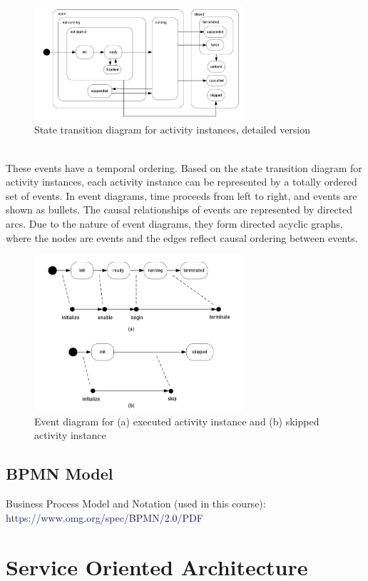 \documentclass[10pt,a4paper]{article}
\begin{document}
\begin{figure}[ht!]
 \hfill \includegraphics[width=220pt]{images/activity-models-2}\hspace*{\fill}
 \caption{State transition diagram for activity instances, detailed version}
  \label{fig:activity-models-2}
\end{figure}\\
These events have a temporal ordering. Based on the state transition diagram for activity instances, each activity instance can be represented by a totally ordered set of events. 
\pagebreak
In event diagrams, time proceeds from left to right, and events are shown as bullets. The causal relationships of events are represented by directed arcs. Due to the nature of event diagrams, they form directed acyclic graphs, where the nodes are events and the edges reflect causal ordering between events.
\begin{figure}[ht!]
 \hfill \includegraphics[width=220pt]{images/event-diagram}\hspace*{\fill}
 \caption{Event diagram for (a) executed activity instance and (b) skipped activity instance}
  \label{fig:event-diagram}
\end{figure}
\subsection{BPMN Model}
Business Process Model and Notation (used in this course): \textcolor{MidnightBlue}{https://www.omg.org/spec/BPMN/2.0/PDF}
\pagebreak
\section{\LARGE Service Oriented Architecture}
\end{document}
